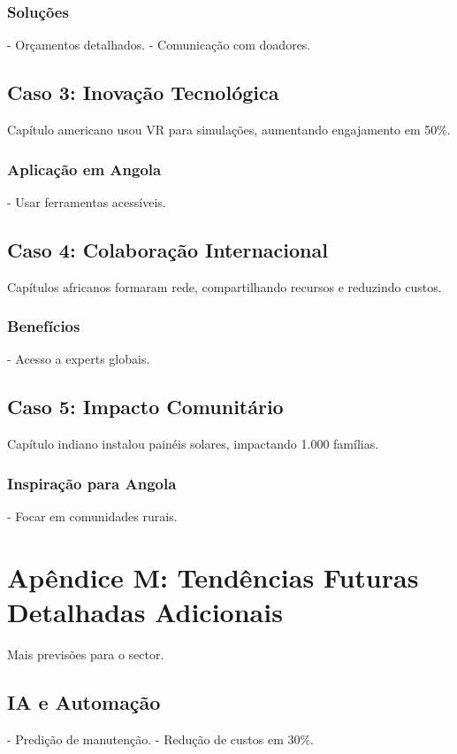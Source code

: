 \documentclass[12pt]{article}
\begin{document}
\subsubsection{Soluções}
- Orçamentos detalhados.
- Comunicação com doadores.

\subsection{Caso 3: Inovação Tecnológica}
Capítulo americano usou VR para simulações, aumentando engajamento em 50\%.

\subsubsection{Aplicação em Angola}
- Usar ferramentas acessíveis.

\subsection{Caso 4: Colaboração Internacional}
Capítulos africanos formaram rede, compartilhando recursos e reduzindo custos.

\subsubsection{Benefícios}
- Acesso a experts globais.

\subsection{Caso 5: Impacto Comunitário}
Capítulo indiano instalou painéis solares, impactando 1.000 famílias.

\subsubsection{Inspiração para Angola}
- Focar em comunidades rurais.

\section{Apêndice M: Tendências Futuras Detalhadas Adicionais}

Mais previsões para o sector.

\subsection{IA e Automação}
- Predição de manutenção.
- Redução de custos em 30\%.
\end{document}
